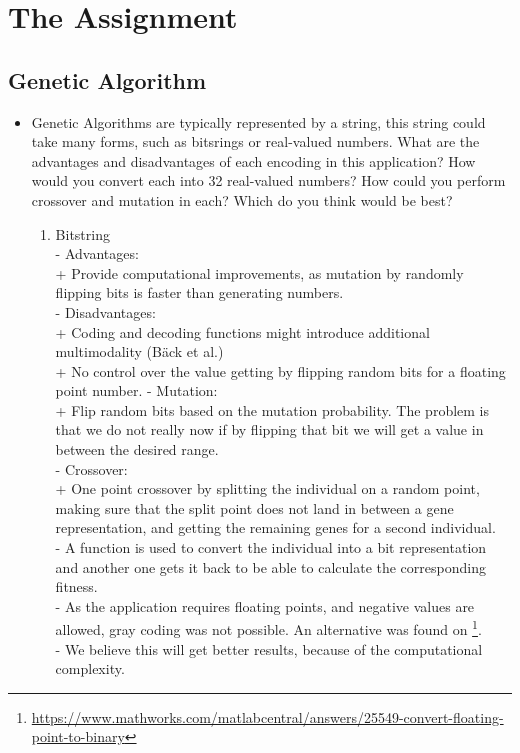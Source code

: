 \documentclass{article}
\begin{document}
\newpage


\newpage
\section{The Assignment}

\subsection{Genetic Algorithm}
\begin{itemize}
	\item Genetic Algorithms are typically represented by a string, this string could take many forms, such as bitsrings or real-valued numbers. What are the advantages and disadvantages of each encoding in this application? How would you convert each into 32 real-valued numbers? How could you perform crossover and mutation in each? Which do you think would be best?
	\begin{enumerate}
		\item {Bitstring
		\\\color{blue}
		- Advantages: \\
		+ Provide computational improvements, as mutation by randomly flipping bits is faster than generating numbers.\\
		- Disadvantages: \\
		+ Coding and decoding functions might introduce additional multimodality (Bäck et al.)\\
		+ No control over the value getting by flipping random bits for a floating point number.
		- Mutation:\\
		+ Flip random bits based on the mutation probability. The problem is that we do not really now if by flipping that bit we will get a value in between the desired range.\\
		- Crossover:\\
		+ One point crossover by splitting the individual on a random point, making sure that the split point does not land in between a gene representation, and getting the remaining genes for a second individual.\\
		- A function is used to convert the individual into a bit representation and another one gets it back to be able to calculate the corresponding fitness.\\
		- As the application requires floating points, and negative values are allowed, gray coding was not possible. An alternative was found on \footnote{\url{https://www.mathworks.com/matlabcentral/answers/25549-convert-floating-point-to-binary}}.\\
		- We believe this will get better results, because of the computational complexity.\\
		
}
\end{enumerate}
\end{itemize}
\end{document}
